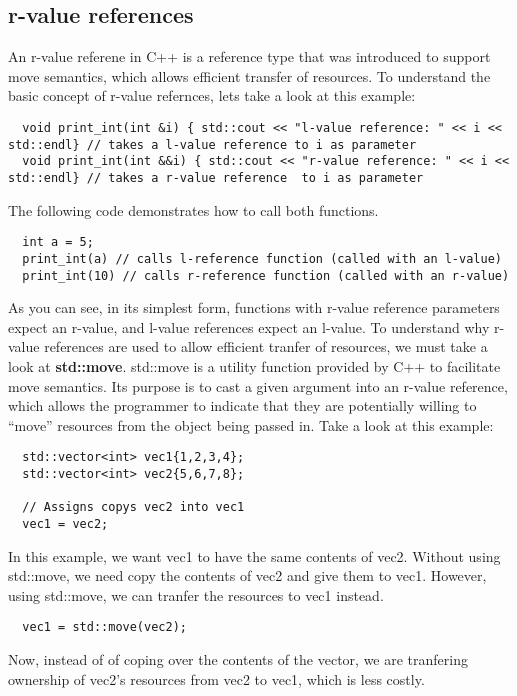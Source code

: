 \documentclass{report}
\begin{document}
\subsection{r-value references}
An r-value referene in C++ is a reference type that was introduced to support move semantics, which allows efficient transfer of resources.
\bigbreak \noindent
To understand the basic concept of r-value refernces, lets take a look at this example:
\begin{verbatim}
  void print_int(int &i) { std::cout << "l-value reference: " << i << std::endl} // takes a l-value reference to i as parameter
  void print_int(int &&i) { std::cout << "r-value reference: " << i << std::endl} // takes a r-value reference  to i as parameter
\end{verbatim}
The following code demonstrates how to call both functions.
\begin{verbatim}
  int a = 5;
  print_int(a) // calls l-reference function (called with an l-value)
  print_int(10) // calls r-reference function (called with an r-value)
\end{verbatim}
As you can see, in its simplest form, functions with r-value reference parameters expect an r-value, and l-value references expect an l-value. To understand why r-value references are used to allow efficient tranfer of resources, we must take a look at \textbf{std::move}.
\bigbreak \noindent
std::move is a utility function provided by C++ to facilitate move semantics. Its purpose is to cast a given argument into an r-value reference, which allows the programmer to indicate that they are potentially willing to ``move'' resources from the object being passed in. Take a look at this example:
\begin{verbatim}
  std::vector<int> vec1{1,2,3,4};
  std::vector<int> vec2{5,6,7,8};

  // Assigns copys vec2 into vec1
  vec1 = vec2;
\end{verbatim}
In this example, we want vec1 to have the same contents of vec2. Without using std::move,  we need copy the contents of vec2 and give them to vec1. However, using std::move, we can tranfer the resources to vec1 instead.
\begin{verbatim}
  vec1 = std::move(vec2);
\end{verbatim}
Now, instead of of coping over the contents of the vector, we are tranfering ownership of vec2's resources from vec2 to vec1, which is less costly.
\end{document}
